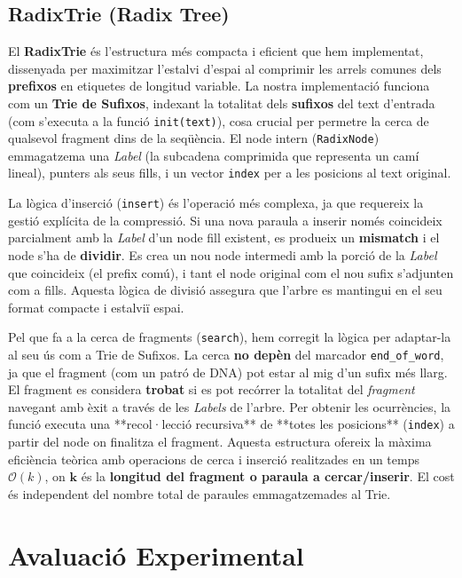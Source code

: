 \subsection{RadixTrie (Radix Tree)}
El \textbf{RadixTrie} és l'estructura més compacta i eficient que hem implementat, dissenyada per maximitzar l'estalvi d'espai al comprimir les arrels comunes dels \textbf{prefixos} en etiquetes de longitud variable. La nostra implementació funciona com un \textbf{Trie de Sufixos}, indexant la totalitat dels \textbf{sufixos} del text d'entrada (com s'executa a la funció \texttt{init(text)}), cosa crucial per permetre la cerca de qualsevol fragment dins de la seqüència. El node intern (\texttt{RadixNode}) emmagatzema una \textit{Label} (la subcadena comprimida que representa un camí lineal), punters als seus fills, i un vector \texttt{index} per a les posicions al text original.

La lògica d'inserció (\texttt{insert}) és l'operació més complexa, ja que requereix la gestió explícita de la compressió. Si una nova paraula a inserir només coincideix parcialment amb la \textit{Label} d'un node fill existent, es produeix un \textbf{mismatch} i el node s'ha de \textbf{dividir}. Es crea un nou node intermedi amb la porció de la \textit{Label} que coincideix (el prefix comú), i tant el node original com el nou sufix s'adjunten com a fills. Aquesta lògica de divisió assegura que l'arbre es mantingui en el seu format compacte i estalviï espai.

Pel que fa a la cerca de fragments (\texttt{search}), hem corregit la lògica per adaptar-la al seu ús com a Trie de Sufixos. La cerca \textbf{no depèn} del marcador \texttt{end\_of\_word}, ja que el fragment (com un patró de DNA) pot estar al mig d'un sufix més llarg. El fragment es considera \textbf{trobat} si es pot recórrer la totalitat del \textit{fragment} navegant amb èxit a través de les \textit{Labels} de l'arbre. Per obtenir les ocurrències, la funció executa una **recol·lecció recursiva** de **totes les posicions** (\texttt{index}) a partir del node on finalitza el fragment. Aquesta estructura ofereix la màxima eficiència teòrica amb operacions de cerca i inserció realitzades en un temps $\mathcal{O}(k)$, on $\boldsymbol{k}$ és la \textbf{longitud del fragment o paraula a cercar/inserir}. El cost és independent del nombre total de paraules emmagatzemades al Trie.

\section{Avaluació Experimental}


